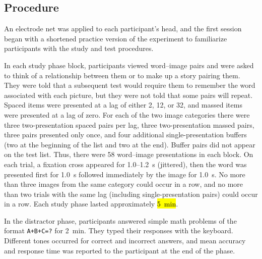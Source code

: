 \subsection{Procedure}

An electrode net was applied to each participant's head, and the first session began with a shortened practice version of the experiment to familiarize participants with the study and test procedures.




In each study phase block, participants viewed word--image pairs and were asked to think of a relationship between them or to make up a story pairing them.  They were told that a subsequent test would require them to remember the word associated with each picture, but they were not told that some pairs will repeat.  Spaced items were presented at a lag of either 2, 12, or 32, and massed items were presented at a lag of zero.  For each of the two image categories there were three two-presentation spaced pairs per lag, three two-presentation massed pairs, three pairs presented only once, and four additional single-presentation buffers (two at the beginning of the list and two at the end).  Buffer pairs did not appear on the test list.
Thus, there were 58 word--image presentations in each block.  On each trial, a fixation cross appeared for 1.0--1.2~s (jittered), then the word was presented first for 1.0~s followed immediately by the image for 1.0~s.  No more than three images from the same category could occur in a row, and no more than two trials with the same lag (including single-presentation pairs) could occur in a row.  Each study phase lasted approximately \hl{5~min}.

In the distractor phase, participants answered simple math problems of the format \texttt{A+B+C=?} for 2~min.  They typed their responses with the keyboard.  Different tones occurred for correct and incorrect answers, and mean accuracy and response time was reported to the participant at the end of the phase.


